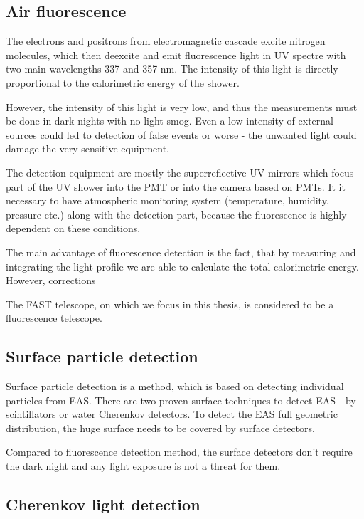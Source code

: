 \subsection{Air fluorescence}
The electrons and positrons from electromagnetic cascade excite nitrogen molecules, which then deexcite and emit fluorescence light in UV spectre with two main wavelengths 337 and 357 nm. The intensity of this light is directly proportional to the calorimetric energy of the shower.
\par
However, the intensity of this light is very low, and thus the measurements must be done in dark nights with no light smog. Even a low intensity of external sources could led to detection of false events or worse - the unwanted light could damage the very sensitive equipment. 
\par
The detection equipment are mostly the superreflective UV mirrors which focus part of the UV shower into the PMT or into the camera based on PMTs. It it necessary to have atmospheric monitoring system (temperature, humidity, pressure etc.) along with the detection part, because the fluorescence is highly dependent on these conditions.  
\par
The main advantage of fluorescence detection is the fact, that by measuring and integrating the light profile we are able to calculate the total calorimetric energy. However, corrections   

\par
The FAST telescope, on which we focus in this thesis, is considered to be a fluorescence telescope.
\subsection{Surface particle detection}
Surface particle detection is a method, which is based on detecting individual particles from EAS. There are two proven surface techniques to detect EAS - by scintillators or water Cherenkov detectors. To detect the EAS full geometric distribution, the huge surface needs to be covered by surface detectors. 


\par
Compared to fluorescence detection method, the surface detectors don't require the dark night and any light exposure is not a threat for them.  



\subsection{Cherenkov light detection}


